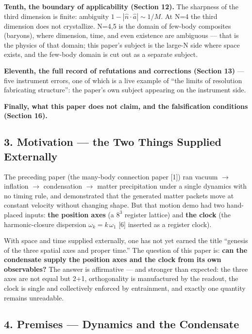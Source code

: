\documentclass[
  a4paper,
]{article}
\begin{document}
\textbf{Tenth, the boundary of applicability (Section 12).} The
sharpness of the third dimension is finite: ambiguity
\(1-|\hat n\cdot\hat a| \sim 1/M\). At N=4 the third dimension does not
crystallize. N=4,5 is the domain of few-body composites (baryons), where
dimension, time, and even existence are ambiguous --- that is the
physics of that domain; this paper's subject is the large-N side where
space exists, and the few-body domain is cut out as a separate subject.

\textbf{Eleventh, the full record of refutations and corrections
(Section 13)} --- five instrument errors, one of which is a live example
of ``the limits of resolution fabricating structure'': the paper's own
subject appearing on the instrument side.

\textbf{Finally, what this paper does not claim, and the falsification
conditions (Section 16).}

\subsection{3. Motivation --- the Two Things Supplied
Externally}\label{motivation-the-two-things-supplied-externally}

The preceding paper (the many-body connection paper {[}1{]}) ran vacuum
\(\to\) inflation \(\to\) condensation \(\to\) matter precipitation
under a single dynamics with no timing rule, and demonstrated that the
generated matter packets move at constant velocity without changing
shape. But that motion demo had two hand-placed inputs: \textbf{the
position axes} (a \(8^3\) register lattice) and \textbf{the clock} (the
harmonic-closure dispersion \(\omega_k = k\,\omega_1\) {[}6{]} inserted
as a register clock).

With space and time supplied externally, one has not yet earned the
title ``genesis of the three spatial axes and proper time.'' The
question of this paper is: \textbf{can the condensate supply the
position axes and the clock from its own observables?} The answer is
affirmative --- and stronger than expected: the three axes are not equal
but 2+1, orthogonality is manufactured by the readout, the clock is
single and collectively enforced by entrainment, and exactly one
quantity remains unreadable.

\subsection{4. Premises --- Dynamics and the
Condensate}\label{premises-dynamics-and-the-condensate}
\end{document}
